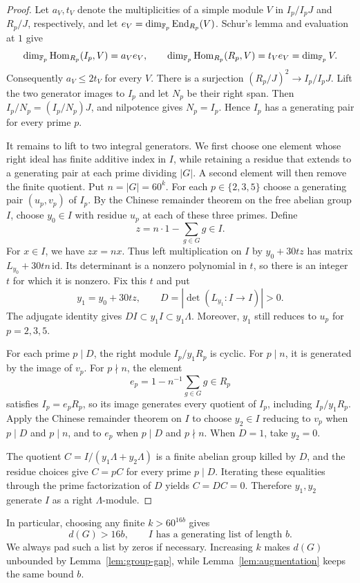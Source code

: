 \begin{proof}
Let $a_V,t_V$ denote the multiplicities of a simple module $V$ in
$I_p/I_pJ$ and $R_p/J$, respectively, and let
$e_V=\dim_{\mathbb F_p}\operatorname{End}_{R_p}(V)$. Schur's lemma and evaluation at $1$
give
\[
 \dim_{\mathbb F_p}\operatorname{Hom}_{R_p}(I_p,V)=a_Ve_V,
 \qquad
 \dim_{\mathbb F_p}\operatorname{Hom}_{R_p}(R_p,V)=t_Ve_V=\dim_{\mathbb F_p}V.
\]
Consequently $a_V\le2t_V$ for every $V$. There is a surjection
$(R_p/J)^2\to I_p/I_pJ$. Lift the two generator images to $I_p$
and let $N_p$ be their right span. Then
$I_p/N_p=(I_p/N_p)J$, and nilpotence gives $N_p=I_p$.
Hence $I_p$ has a generating pair for every prime $p$.

It remains to lift to two integral generators. We first choose one
element whose right ideal has finite additive index in $I$, while
retaining a residue that extends to a generating pair at each prime
dividing $|G|$. A second element will then remove the finite quotient.
Put $n=|G|=60^k$.
For each $p\in\{2,3,5\}$ choose a generating pair
$(u_p,v_p)$ of $I_p$. By the Chinese remainder theorem on the free
abelian group $I$, choose $y_0\in I$ with residue $u_p$ at each of
these three primes. Define
\[
 z=n\cdot1-\sum_{g\in G}g\in I.
\]
For $x\in I$, we have $zx=nx$. Thus left multiplication on $I$ by
$y_0+30t z$ has matrix $L_{y_0}+30tn\,\mathrm{id}$. Its determinant
is a nonzero polynomial in $t$, so there is an integer $t$ for which
it is nonzero. Fix this $t$ and put
\[
 y_1=y_0+30t z,\qquad D=|\det(L_{y_1}:I\to I)|>0.
\]
The adjugate identity gives $DI\subset y_1I\subset y_1\Lambda$.
Moreover, $y_1$ still reduces to $u_p$ for $p=2,3,5$.

For each prime $p\mid D$, the right module $I_p/y_1R_p$ is cyclic.
For $p\mid n$, it is generated by the image of $v_p$.
For $p\nmid n$, the element
\[
 e_p=1-n^{-1}\sum_{g\in G}g\in R_p
\]
satisfies $I_p=e_pR_p$, so its image generates every quotient of
$I_p$, including $I_p/y_1R_p$. Apply the Chinese remainder theorem on $I$
to choose $y_2\in I$ reducing to $v_p$ when $p\mid D$ and $p\mid n$,
and to $e_p$ when $p\mid D$ and $p\nmid n$. When $D=1$,
take $y_2=0$.

The quotient $C=I/(y_1\Lambda+y_2\Lambda)$ is a finite abelian group
killed by $D$, and the residue choices give $C=pC$ for every prime
$p\mid D$. Iterating these equalities through the prime factorization
of $D$ yields $C=DC=0$. Therefore $y_1,y_2$ generate $I$ as a right
$\Lambda$-module.
\end{proof}

In particular, choosing any finite $k>60^{16b}$ gives
\begin{equation}\label{eq:generator-gap}
  d(G)>16b,
  \qquad I\text{ has a generating list of length }b.
\end{equation}
We always pad such a list by zeros if necessary.  Increasing $k$ makes
$d(G)$ unbounded by Lemma~\ref{lem:group-gap}, while
Lemma~\ref{lem:augmentation} keeps the same bound $b$.

